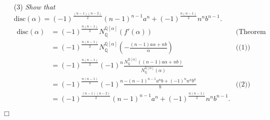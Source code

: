 \documentclass{article}
\begin{document}
\begin{enumerate}
\item[(3)]
  \emph{Show that $\textrm{disc}(\alpha) = (-1)^{\frac{(n-1)(n-2)}{2}} (n-1)^{n-1}a^n
    + (-1)^{\frac{n(n-1)}{2}} n^n b^{n-1}$.}
  \begin{align*}
    \textrm{disc}(\alpha)
    &= (-1)^{\frac{n(n-1)}{2}} N_{\mathbb{Q}}^{\mathbb{Q}[\alpha]}(f'(\alpha))
      &\text{(Theorem 2.8)} \\
    &= (-1)^{\frac{n(n-1)}{2}} N_{\mathbb{Q}}^{\mathbb{Q}[\alpha]}
      \left( -\frac{(n-1)a\alpha+nb}{\alpha} \right)
      &\text{((1))} \\
    &= (-1)^{\frac{n(n-1)}{2}}(-1)^n
      \frac{N_{\mathbb{Q}}^{\mathbb{Q}[\alpha]}((n-1)a\alpha+nb)}
      {N_{\mathbb{Q}}^{\mathbb{Q}[\alpha]}(\alpha)} \\
    &= (-1)^{\frac{n(n-1)}{2}}(-1)^n \frac{-(n-1)^{n-1}a^nb+(-1)^n n^n b^n}{b}
      &\text{((2))} \\
    &= (-1)^{\frac{(n-1)(n-2)}{2}} (n-1)^{n-1}a^n
      + (-1)^{\frac{n(n-1)}{2}} n^n b^{n-1}.
  \end{align*}
\end{enumerate}
$\Box$ \\\\



\end{document}
